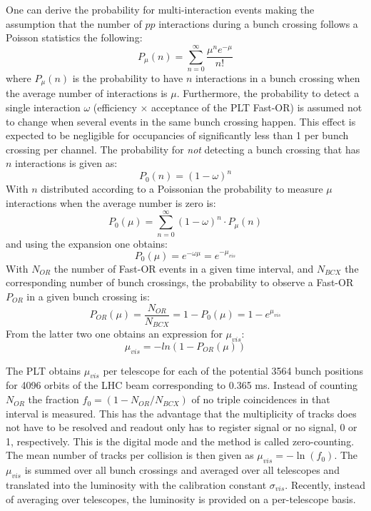 One can derive the probability for multi-interaction events making the assumption that 
the number of $pp$ interactions during a bunch crossing follows a Poisson statistics the following:
\begin{equation}
P_{\mu}(n) = \sum_{n=0}^{\infty} \frac{\mu^n e^{-\mu}}{n!}
\end{equation}
where $P_\mu(n)$ is the probability to have $n$ interactions in a bunch crossing when the average 
number of interactions is $\mu$. Furthermore, the probability to detect a single interaction $\omega$ 
(efficiency $\times$ acceptance of the PLT Fast-OR) is assumed not to change when several events in the same 
bunch crossing happen. This effect is expected to be negligible for occupancies of significantly less than 1 per 
bunch crossing per channel. The probability for {\em not} detecting a bunch crossing
that has $n$ interactions is given as:
\begin{equation}
P_0(n) = (1 - \omega)^n 
\end{equation}
With $n$ distributed according to a Poissonian the probability to measure $\mu$ interactions
when the average number is zero is:
\begin{equation}
P_0(\mu) = \sum_{n=0}^{\infty} (1 - \omega)^n \cdot P_{\mu}(n)
\end{equation}
and using the expansion one obtains:
\begin{equation}
P_0(\mu) = e^{-\omega \mu} = e^{-\mu_{vis}}
\end{equation} 
With $N_{OR}$ the number of Fast-OR events in a given time interval, and $N_{BCX}$ the
corresponding number of bunch crossings, the probability to observe a Fast-OR $P_{OR}$ 
in a given bunch crossing is:
\begin{equation}
P_{OR}(\mu) = \frac{N_{OR}}{N_{BCX}} = 1 - P_0(\mu) = 1 - e^{\mu_{vis}}
\end{equation} 
From the latter two one obtains an expression for $\mu_{vis}$:
\begin{equation}
\mu_{vis} = - ln(1 - P_{OR}(\mu))
\end{equation}
 
The PLT obtains $\mu_{vis}$ per telescope for each of the potential 3564 bunch positions  
for 4096 orbits of the LHC beam corresponding to 0.365 ms.
Instead of counting $N_{OR}$ the fraction $f_0 = (1 - N_{OR}/N_{BCX})$ of no triple coincidences
in that interval is measured. This has the advantage that the multiplicity of tracks does not have
to be resolved and readout only has to register signal or no signal, 0 or 1, respectively.
This is the digital mode and the method is called zero-counting. The mean number of tracks per collision 
is then given as $\mu_{vis} = -\ln ( f_0 )$.
The $\mu_{vis}$ is summed over all bunch crossings and averaged over all telescopes
and translated into the luminosity with the calibration constant $\sigma_{vis}$.
Recently, instead of averaging over telescopes, the luminosity is provided on a per-telescope basis.



